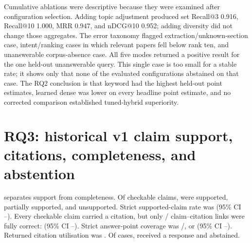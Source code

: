 Cumulative ablations were descriptive because they were examined after configuration selection. Adding topic adjustment produced set Recall@3 0.916, Recall@10 1.000, MRR 0.947, and nDCG@10 0.952; adding diversity did not change those aggregates. The error taxonomy flagged \RetrievalExtractionErrorCaseCount{} extraction/unknown-section case, \RetrievalIntentMismatchCaseCount{} intent/ranking cases in which relevant papers fell below rank ten, and \RetrievalCorpusAbsenceCaseCount{} unanswerable corpus-absence case. All five modes returned a positive result for the one held-out unanswerable query. This single case is too small for a stable rate; it shows only that none of the evaluated configurations abstained on that case. The RQ2 conclusion is that keyword had the highest held-out point estimates, learned dense was lower on every headline point estimate, and no corrected comparison established tuned-hybrid superiority.

\section{RQ3: historical v1 claim support, citations, completeness, and abstention}

 separates support from completeness. Of \QaClaimCount{} checkable claims, \QaSupportedClaimCount{} were supported, \QaPartiallySupportedClaimCount{} partially supported, and \QaUnsupportedClaimCount{} unsupported. Strict supported-claim rate was \QaSupportedClaimRate{} (95\% CI \QaSupportedClaimRateLow{}--\QaSupportedClaimRateHigh{}). Every checkable claim carried a citation, but only \QaCorrectCitationCount{}/\QaClaimCount{} claim--citation links were fully correct: \QaCitationCorrectness{} (95\% CI \QaCitationCorrectnessLow{}--\QaCitationCorrectnessHigh{}). Strict answer-point coverage was \QaCoveredAnswerPointCount{}/\QaAnswerPointCount{}, or \QaAnswerPointCoverage{} (95\% CI \QaAnswerPointCoverageLow{}--\QaAnswerPointCoverageHigh{}). Returned citation utilisation was \QaCitationUtilization{}. Of \QaCaseCount{} cases, \QaResponseCount{} received a response and \QaAbstentionCount{} abstained.

